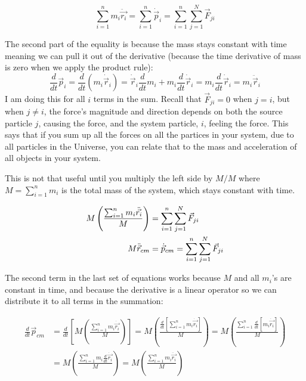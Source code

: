 \documentclass[10pt]{article}
\begin{document}
\begin{equation}
    \sum_{i=1}^n m_i\ddot{\vec{r_i}} = \sum_{i=1}^n \dot{\vec{p}}_i 
        = \sum_{i=1}^n\sum_{j=1}^{N}\vec{F}_{ji} \label{n2mx}
\end{equation}

The second part of the equality is because the mass stays constant 
with time meaning we can pull it out of the derivative (because 
the time derivative of mass is zero when we apply the product rule):
\begin{equation*}
    \frac{d}{dt}\vec{p}_i = \frac{d}{dt}(m_i\dot\vec{r}_i) = 
        \dot{\vec{r}}_i\frac{d}{dt}m_i + m_i\frac{d}{dt}\dot{\vec{r}}_i = 
        m_i\frac{d}{dt}\dot{\vec{r}}_i = m_i\ddot{\vec{r}}_i
\end{equation*}
I am doing this for all $i$ terms in the sum. 
Recall that $\vec{F}_{ji} = 0$ when $j=i$, but when $j\neq i$,
the force's magnitude and direction depends on
both the source particle $j$, causing the force, and the system particle, $i$,
feeling the force. This says that if you sum up all the forces on all 
the partices in your system, due to all particles in the Universe, you can 
relate that to the mass and acceleration of all objects in your system. 

This is not that useful until you multiply the left side by $M/M$ where 
$M = \sum_{i=1}^n m_i$ is the total mass of the system, which stays constant 
with time.

\begin{align}
    M\left(\frac{\sum_{i=1}^n m_i\ddot{\vec{r_i}}}{M}\right) 
        &= \sum_{i=1}^n\sum_{j=1}^{N}\vec{F}_{ji} \notag \\
    M\ddot{\vec{r}}_{cm} & = \dot{\vec{p}}_{cm}
       = \sum_{i=1}^n\sum_{j=1}^{N}\vec{F}_{ji} \label{n2m0}
\end{align}

The second term in the last set of equations works because $M$ and all $m_i$'s 
are constant in time, and because the derivative is a linear operator 
so we can distribute it to all terms in the summation:

\begin{align*}
    \frac{d}{dt}\vec{p}_{cm} &= \frac{d}{dt}\left[
        M\left(\frac{\sum_{i=1}^n m_i\dot{\vec{r_i}}}{M}\right)\right]
    = M\left(\frac{\frac{d}{dt}\left[\sum_{i=1}^n m_i\dot{\vec{r_i}}\right]}{M}\right)
    = M\left(\frac{\sum_{i=1}^n\frac{d}{dt}[m_i\dot{\vec{r_i}}]}{M}\right) \\
    &= M\left(\frac{\sum_{i=1}^n m_i\frac{d}{dt}\dot{\vec{r_i}}}{M}\right)
    = M\left(\frac{\sum_{i=1}^n m_i\ddot{\vec{r_i}}}{M}\right)
\end{align*}
\end{document}
